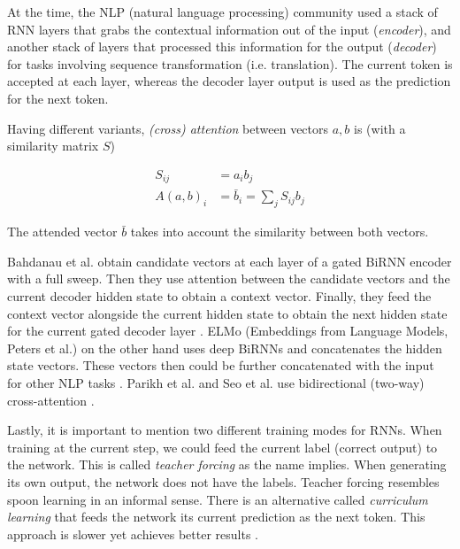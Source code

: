 \documentclass{article}
\begin{document}
At the time, the NLP (natural language processing) community used a stack of RNN layers that grabs the contextual information out of the input (\textit{encoder}), and another stack of layers that processed this information for the output (\textit{decoder}) for tasks involving sequence transformation (i.e. translation). The current token is accepted at each layer, whereas the decoder layer output is used as the prediction for the next token.

Having different variants, \textit{(cross) attention} between vectors $a, b$ is (with a similarity matrix $S$)

\begin{align}
    S_{ij} &= a_i b_j\\
    A(a,b)_{i} &= \bar{b}_{i} = \sum_j S_{ij} b_j
\end{align}

The attended vector $\bar{b}$ takes into account the similarity between both vectors.

Bahdanau et al. obtain candidate vectors at each layer of a gated BiRNN encoder with a full sweep. Then they use attention between the candidate vectors and the current decoder hidden state to obtain a context vector. Finally, they feed the context vector alongside the current hidden state to obtain the next hidden state for the current gated decoder layer \cite{bahdanau_neural_2016}. ELMo (Embeddings from Language Models, Peters et al.) on the other hand uses deep BiRNNs and concatenates the hidden state vectors. These vectors then could be further concatenated with the input for other NLP tasks \cite{peters_deep_2018}. Parikh et al. and Seo et al. use bidirectional (two-way) cross-attention \cite{parikh_decomposable_2016, seo_bidirectional_2018}.

Lastly, it is important to mention two different training modes for RNNs. When training at the current step, we could feed the current label (correct output) to the network. This is called \textit{teacher forcing} as the name implies. When generating its own output, the network does not have the labels. Teacher forcing resembles spoon learning in an informal sense. There is an alternative called \textit{curriculum learning} that feeds the network its current prediction as the next token. This approach is slower yet achieves better results \cite{lapan_deep_2020}.
\end{document}
